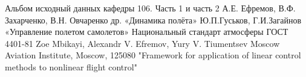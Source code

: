 \newpage
\begin{thebibliography}{10}
    Альбом исходный данных кафедры 106. Часть 1 и часть 2   
    А.Е. Ефремов, В.Ф. Захарченко, В.Н. Овчаренко др. «Динамика полёта»
    Ю.П.Гуськов, Г.И.Загайнов «Управление полетом самолетов»
    Национальный стандарт атмосферы ГОСТ 4401-81
    Zoe Mbikayi, Alexandr V. Efremov, Yury V. Tiumentsev Moscow Aviation Institute, Moscow, 125080 "Framework for application of linear control methods to nonlinear  flight control"
\end{thebibliography}